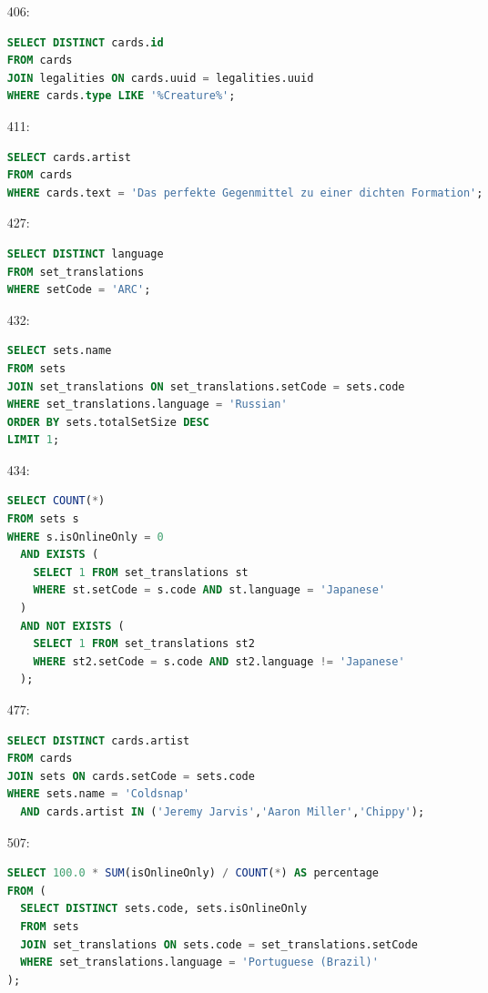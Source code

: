 \documentclass[11pt]{article}
\begin{document}
\begin{enumerate}
\item[406:]
\begin{lstlisting}[language=SQL]
SELECT DISTINCT cards.id
FROM cards
JOIN legalities ON cards.uuid = legalities.uuid
WHERE cards.type LIKE '%Creature%';
\end{lstlisting}

\item[411:]
\begin{lstlisting}[language=SQL]
SELECT cards.artist
FROM cards
WHERE cards.text = 'Das perfekte Gegenmittel zu einer dichten Formation';
\end{lstlisting}

\item[427:]
\begin{lstlisting}[language=SQL]
SELECT DISTINCT language
FROM set_translations
WHERE setCode = 'ARC';
\end{lstlisting}

\item[432:]
\begin{lstlisting}[language=SQL]
SELECT sets.name
FROM sets
JOIN set_translations ON set_translations.setCode = sets.code
WHERE set_translations.language = 'Russian'
ORDER BY sets.totalSetSize DESC
LIMIT 1;
\end{lstlisting}

\item[434:]
\begin{lstlisting}[language=SQL]
SELECT COUNT(*)
FROM sets s
WHERE s.isOnlineOnly = 0
  AND EXISTS (
    SELECT 1 FROM set_translations st
    WHERE st.setCode = s.code AND st.language = 'Japanese'
  )
  AND NOT EXISTS (
    SELECT 1 FROM set_translations st2
    WHERE st2.setCode = s.code AND st2.language != 'Japanese'
  );
\end{lstlisting}

\item[477:]
\begin{lstlisting}[language=SQL]
SELECT DISTINCT cards.artist
FROM cards
JOIN sets ON cards.setCode = sets.code
WHERE sets.name = 'Coldsnap'
  AND cards.artist IN ('Jeremy Jarvis','Aaron Miller','Chippy');
\end{lstlisting}

\item[507:]
\begin{lstlisting}[language=SQL]
SELECT 100.0 * SUM(isOnlineOnly) / COUNT(*) AS percentage
FROM (
  SELECT DISTINCT sets.code, sets.isOnlineOnly
  FROM sets
  JOIN set_translations ON sets.code = set_translations.setCode
  WHERE set_translations.language = 'Portuguese (Brazil)'
);
\end{lstlisting}


\end{enumerate}
\end{document}
